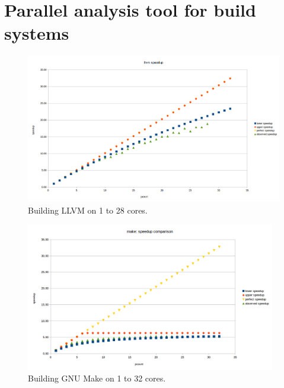 \documentclass[10pt]{article}
\begin{document}






\section{Parallel analysis tool for build systems}

\begin{figure}[t]
  \includegraphics[height=6.5cm]{llvm-speedup-chart.png}
  \caption{Building LLVM on 1 to 28 cores.}\label{fig:llvm}  %
\end{figure}

\begin{figure}[t]
  \includegraphics[height=6.5cm]{make-speedup-comparison.png}
  \caption{Building GNU Make on 1 to 32 cores.}\label{fig:make}
\end{figure}
\end{document}
